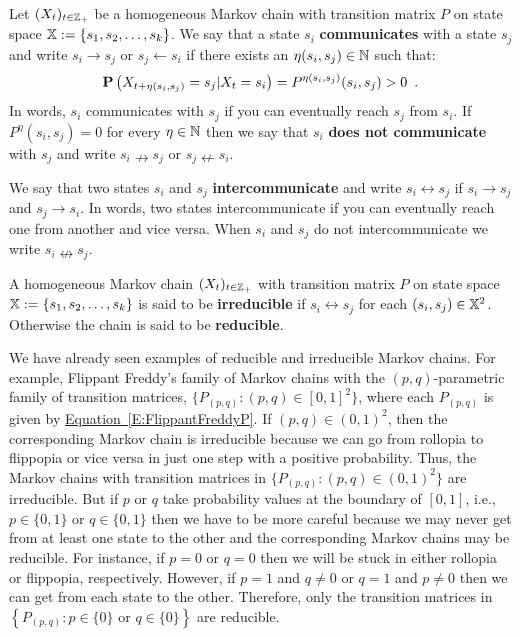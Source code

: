 {\begin{definition}\label{D:Communication} Let $(X_t)_{t\in\mathbb{Z}_+}$ be a homogeneous Markov chain with transition matrix $P$ on state space $\mathbb{X}:=\{s_1,s_2,\ldots,s_k\}$.  
We say that a state $s_i$ {\bf communicates} with a state $s_j$ and write $s_i \rightarrow s_j$ or $s_j \leftarrow s_i$ if there exists an $\eta(s_i,s_j) \in \mathbb{N}$ such that:
\[
\mathbf{P} \left( X_{t+\eta(s_i,s_j)} = s_j | X_t = s_i \right) = P^{\eta(s_i,s_j)} (s_i, s_j) > 0 \enspace .
\] 
In words, $s_i$ communicates with $s_j$ if you can eventually reach $s_j$ from $s_i$.  If $P^{\eta} (s_i, s_j)=0$ for every $\eta \in \mathbb{N}$ then we say that $s_i$ {\bf does not communicate} with $s_j$ and write $s_i  \nrightarrow s_j$ or $s_j  \nleftarrow s_i$.

We say that two states $s_i$ and $s_j$ {\bf intercommunicate} and write $s_i \leftrightarrow s_j$ if $s_i \rightarrow s_j$ and $s_j \rightarrow s_i$.  In words, two states intercommunicate if you can eventually reach one from another and vice versa.  When $s_i$ and $s_j$ do not intercommunicate we write $s_i \nleftrightarrow s_j$.
\end{definition}

\begin{definition}[Irreducible]\label{D:Irreducible}
A homogeneous Markov chain $(X_t)_{t\in\mathbb{Z}_+}$ with transition matrix $P$ on state space $\mathbb{X}:=\{s_1,s_2,\ldots,s_k\}$ is said to be {\bf irreducible} if $s_i \leftrightarrow s_j$ for each $(s_i,s_j) \in \mathbb{X}^2$.  Otherwise the chain is said to be {\bf reducible}.
\end{definition}

We have already seen examples of reducible and irreducible Markov chains.  For example, Flippant Freddy's family of Markov chains with the $(p,q)$-parametric family of transition matrices, $\{P_{(p,q)} : (p,q) \in [0,1]^2\}$, where each $P_{(p,q)}$ is given by \hyperref[E:FlippantFreddyP]{Equation~\ref*{E:FlippantFreddyP}}.  If $(p,q) \in (0,1)^2$, then the corresponding Markov chain is irreducible because we can go from rollopia to flippopia or vice versa in just one step with a positive probability.  Thus, the Markov chains with transition matrices in $\{P_{(p,q)} : (p,q) \in (0,1)^2\}$ are irreducible.  But if $p$ or $q$ take probability values at the boundary of $[0,1]$, i.e., $p \in \{0,1\}$ or $q \in \{0,1\}$ then we have to be more careful because we may  never get from at least one state to the other and the corresponding Markov chains may be reducible.   For instance, if $p=0$ or $q=0$ then we will be stuck in either rollopia or flippopia, respectively.  However, if $p=1$ and $q \neq 0$ or $q=1$ and $p \neq 0$ then we can get from each  state to the other.  Therefore,  only the transition matrices in $\left\{P_{(p,q)} : p \in \{0\} \text{ or } q \in \{0\}\right\}$ are reducible.

}
